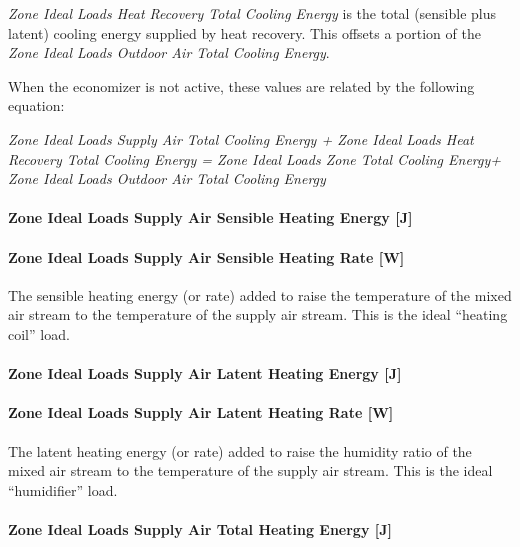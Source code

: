 \emph{Zone Ideal Loads Heat Recovery Total Cooling Energy} is the total (sensible plus latent) cooling energy supplied by heat recovery. This offsets a portion of the \emph{Zone Ideal Loads Outdoor Air Total Cooling Energy}.

When the economizer is not active, these values are related by the following equation:

\emph{Zone Ideal Loads Supply Air Total Cooling Energy + Zone Ideal Loads Heat Recovery Total Cooling Energy = Zone Ideal Loads Zone Total Cooling Energy+ Zone Ideal Loads Outdoor Air Total Cooling Energy}

\paragraph{Zone Ideal Loads Supply Air Sensible Heating Energy {[}J{]}}\label{zone-ideal-loads-supply-air-sensible-heating-energy-j}

\paragraph{Zone Ideal Loads Supply Air Sensible Heating Rate {[}W{]}}\label{zone-ideal-loads-supply-air-sensible-heating-rate-w}

The sensible heating energy (or rate) added to raise the temperature of the mixed air stream to the temperature of the supply air stream. This is the ideal ``heating coil'' load.

\paragraph{Zone Ideal Loads Supply Air Latent Heating Energy {[}J{]}}\label{zone-ideal-loads-supply-air-latent-heating-energy-j}

\paragraph{Zone Ideal Loads Supply Air Latent Heating Rate {[}W{]}}\label{zone-ideal-loads-supply-air-latent-heating-rate-w}

The latent heating energy (or rate) added to raise the humidity ratio of the mixed air stream to the temperature of the supply air stream. This is the ideal ``humidifier'' load.

\paragraph{Zone Ideal Loads Supply Air Total Heating Energy {[}J{]}}\label{zone-ideal-loads-supply-air-total-heating-energy-j}

